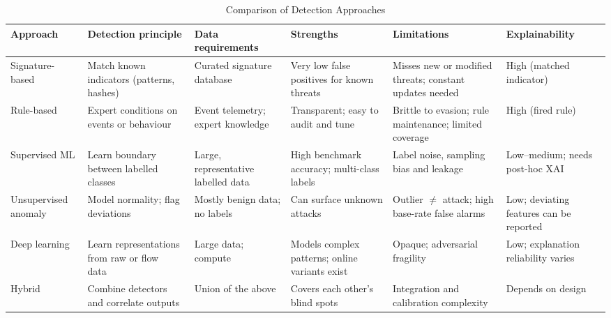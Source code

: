 \documentclass[conference]{IEEEtran}
\begin{document}
\begin{table}[t]
\caption{Comparison of Detection Approaches}
\label{tab:approaches}
\centering
\footnotesize
\begin{tabularx}{\textwidth}{@{}p{2.2cm}YYYYp{2.1cm}@{}}
\toprule
\textbf{Approach} & \textbf{Detection principle} & \textbf{Data requirements} & \textbf{Strengths} & \textbf{Limitations} & \textbf{Explainability} \\
\midrule
Signature-based & Match known indicators (patterns, hashes) & Curated signature database & Very low false positives for known threats & Misses new or modified threats; constant updates needed & High (matched indicator) \\
Rule-based & Expert conditions on events or behaviour & Event telemetry; expert knowledge & Transparent; easy to audit and tune & Brittle to evasion; rule maintenance; limited coverage & High (fired rule) \\
Supervised ML & Learn boundary between labelled classes & Large, representative labelled data~\cite{buczak2016survey} & High benchmark accuracy; multi-class labels & Label noise, sampling bias and leakage~\cite{arp2022dos,engelen2021troubleshooting} & Low--medium; needs post-hoc XAI \\
Unsupervised anomaly & Model normality; flag deviations~\cite{liu2008isolation} & Mostly benign data; no labels & Can surface unknown attacks & Outlier $\neq$ attack; high base-rate false alarms~\cite{sommer2010outside} & Low; deviating features can be reported \\
Deep learning & Learn representations from raw or flow data~\cite{shone2018deep,mirsky2018kitsune} & Large data; compute & Models complex patterns; online variants exist~\cite{mirsky2018kitsune} & Opaque; adversarial fragility~\cite{biggio2018wild} & Low; explanation reliability varies~\cite{warnecke2020evaluating} \\
Hybrid & Combine detectors and correlate outputs & Union of the above & Covers each other's blind spots & Integration and calibration complexity & Depends on design \\
\bottomrule
\end{tabularx}
\end{table}
\end{document}
